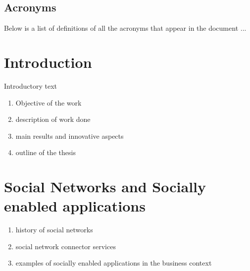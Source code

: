 \documentclass[a4paper]{memoir}
\begin{document}
\section*{Acronyms}
\label{sec:acronyms}
Below is a list of definitions of all the acronyms that appear in the document ...
\begin{acronym}
  \setlength{\itemsep}{0pt}\small
  
\end{acronym}

\clearpage
\tableofcontents
\clearpage
\listoffigures
\clearpage
\listoftables

\mainmatter
\pagestyle{Ruled}

\chapter{Introduction} %
\label{chap:Introduction}
Introductory text
\begin{enumerate}
	\item Objective of the work
	\item description of work done
	\item main results and innovative aspects
	\item outline of the thesis
\end{enumerate}



\chapter{Social Networks and Socially enabled applications} %
\label{chap:Social Networks and Socially enabled applications}
	\begin{enumerate}
		\item history of social networks
		\item social network connector services
		\item examples of socially enabled applications in the business context
	\end{enumerate}
\end{document}
